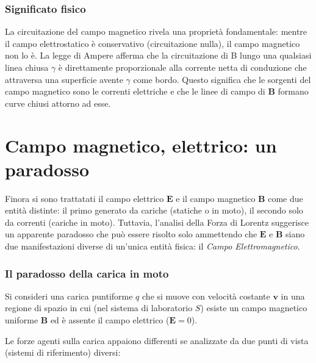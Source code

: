 \documentclass[a4paper,11pt]{report}
\begin{document}
\subsubsection{Significato fisico}
La circuitazione del campo magnetico rivela una proprietà fondamentale: mentre il campo elettrostatico è conservativo (circuitazione nulla), il campo magnetico non lo è. La legge di Ampere afferma che la circuitazione di B lungo una qualsiasi linea chiusa $\gamma$ è direttamente proporzionale alla corrente netta di conduzione che attraversa una superficie avente $\gamma$ come bordo. Questo significa che le sorgenti del campo magnetico sono le correnti elettriche e che le linee di campo di $\bm{B}$ formano curve chiusi attorno ad esse. 


\section{Campo magnetico, elettrico: un paradosso}

Finora si sono trattatati il campo elettrico $\bm{E}$ e il campo magnetico $\bm{B}$ come due entità distinte: il primo generato da cariche (statiche o in moto), il secondo solo da correnti (cariche in moto).
Tuttavia, l'analisi della Forza di Lorentz suggerisce un apparente paradosso che può essere risolto solo ammettendo che $\bm{E}$ e $\bm{B}$ siano due manifestazioni diverse di un'unica entità fisica: il \textit{Campo Elettromagnetico}.

\subsubsection{Il paradosso della carica in moto}
Si consideri una carica puntiforme $q$ che si muove con velocità costante $\bm{v}$ in una regione di spazio in cui (nel sistema di laboratorio $S$) esiste un campo magnetico uniforme $\bm{B}$ ed è assente il campo elettrico ($\bm{E}=0$).

Le forze agenti sulla carica appaiono differenti se analizzate da due punti di vista (sistemi di riferimento) diversi:
\end{document}
